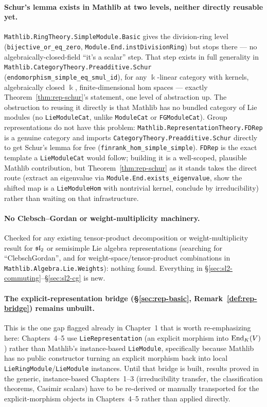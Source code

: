 \paragraph{Schur's lemma exists in Mathlib at two levels, neither directly
reusable yet.} \texttt{Mathlib.RingTheory.SimpleModule.Basic} gives the
division-ring level (\texttt{bijective\_or\_eq\_zero},
\texttt{Module.End.instDivisionRing}) but stops there --- no
algebraically-closed-field ``it's a scalar'' step. That step exists in full
generality in \texttt{Mathlib.CategoryTheory.Preadditive.Schur}
(\texttt{endomorphism\_simple\_eq\_smul\_id}), for any $\Bbbk$-linear
category with kernels, algebraically closed $\Bbbk$, finite-dimensional hom
spaces --- exactly Theorem~\ref{thm:rep-schur}'s statement, one level of
abstraction up. The obstruction to reusing it directly is that Mathlib has
no bundled category of Lie modules (no \texttt{LieModuleCat}, unlike
\texttt{ModuleCat} or \texttt{FGModuleCat}). Group representations do not
have this problem: \texttt{Mathlib.RepresentationTheory.FDRep} is a genuine
category and imports \texttt{CategoryTheory.Preadditive.Schur} directly to
get Schur's lemma for free (\texttt{finrank\_hom\_simple\_simple}).
\texttt{FDRep} is the exact template a \texttt{LieModuleCat} would follow;
building it is a well-scoped, plausible Mathlib contribution, but
Theorem~\ref{thm:rep-schur} as it stands takes the direct route (extract an
eigenvalue via \texttt{Module.End.exists\_eigenvalue}, show the shifted map
is a \texttt{LieModuleHom} with nontrivial kernel, conclude by
irreducibility) rather than waiting on that infrastructure.

\paragraph{No Clebsch--Gordan or weight-multiplicity machinery.} Checked for
any existing tensor-product decomposition or weight-multiplicity result for
$\mathfrak{sl}_2$ or semisimple Lie algebra representations (searching for
``ClebschGordan'', and for weight-space/tensor-product combinations in
\texttt{Mathlib.Algebra.Lie.Weights}): nothing found. Everything in
\S\ref{sec:sl2-commuting}--\S\ref{sec:sl2-cg} is new.

\paragraph{The explicit-representation bridge (\S\ref{sec:rep-basic},
Remark~\ref{def:rep-bridge}) remains unbuilt.} This is the one gap flagged
already in Chapter~1 that is worth re-emphasizing here: Chapters~4--5 use
\texttt{LieRepresentation} (an explicit morphism into $\operatorname{End}_K(V)$) rather
than Mathlib's instance-based \texttt{LieModule}, specifically because
Mathlib has no public constructor turning an explicit morphism back into
local \texttt{LieRingModule}/\texttt{LieModule} instances. Until that bridge
is built, results proved in the generic, instance-based Chapters~1--3
(irreducibility transfer, the classification theorems, Casimir scalars) have
to be re-derived or manually transported for the explicit-morphism objects
in Chapters~4--5 rather than applied directly.

